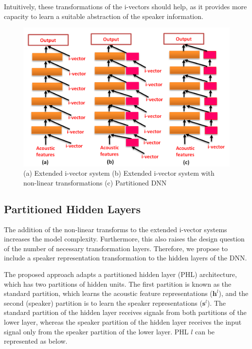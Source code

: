 \documentclass[a4paper]{article}
\begin{document}
    Intuitively, these transformations of the i-vectors should help, as it provides more capacity to learn a suitable abstraction of the speaker information.      

 \begin{figure}[ht]
 	\includegraphics[width=\linewidth]{figure3.png}
 	\caption{(a) Extended i-vector system  (b) Extended i-vector system with non-linear transformations  (c) Partitioned DNN }
 	\label{fig:diagram2}
 \end{figure}
 
 \subsection{Partitioned Hidden Layers}
 
 The addition of the non-linear transforms to the extended i-vector systems increases the model complexity. Furthermore, this also raises the design question of the number of necessary transformation layers.  Therefore, we propose to include a speaker representation transformation to the hidden layers of the DNN.  
 
 The proposed approach adapts a partitioned hidden layer (PHL) architecture, which has two partitions of hidden units. The first partition is known as the standard partition, which learns the acoustic feature representations ($\mathbf{h}^l$), and the second (speaker) partition  is to learn the speaker representations ($\mathbf{s}^l$). The standard partition of the hidden layer receives signals from both partitions of the lower layer, whereas the speaker partition of the hidden layer receives the input signal only from the speaker partition of the lower layer.  PHL $l$  can be represented as below.
 
\end{document}
